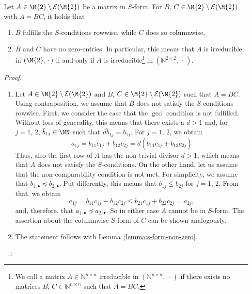 \begin{theorem}\label{theorem:s-form-factors-non-zero}
Let $A \in \M{2}\setminus\mathcal{E}(\M{2})$ be a matrix in $S$-form. For $B$, $C \in \M{2}\setminus\mathcal{E}(\M{2})$ with $A=BC$, it holds that
\begin{enumerate}[label=(\alph*)]
\item $B$ fulfills the $S$-conditions rowwise, while $C$ does so columnwise.
\item $B$ and $C$ have no zero-entries. In particular, this means that $A$ is irreducible in $(\M{2},\, \cdot\,)$ if and only if $A$ is irreducible\footnote{We call a matrix $A \in \mathbb{N}^{n \times n}$ irreducible in $(\mathbb{N}^{n \times n},\,\cdot\,)$ if there exists no matrices $B$, $C \in \mathbb{N}^{n \times n}$ such that $A=BC$.} in $(\mathbb{N}^{2 \times 2},\,\cdot\,)$.
\end{enumerate}
\end{theorem}

\begin{proof}
\begin{enumerate}[label=(\alph*)]
\item Let $A \in \M{2}\setminus\mathcal{E}(\M{2})$ and $B$, $C \in \M{2}\setminus\mathcal{E}(\M{2})$ such that $A = BC$. Using contraposition, we assume that $B$ does not satisfy the $S$-conditions rowwise. First, we consider the case that the $\gcd$ condition is not fulfilled. Without loss of generality, this means that there exists a $d >1$ and, for $j=1, \, 2$, $\tilde{b}_{1j} \in \NN$ such that $d \tilde{b}_{1j} = b_{1j}$. For $j=1, \,2$, we obtain 
\[ a_{1j} = b_{11}c_{1j} + b_{12}c_{2j} = d(\tilde{b}_{11}c_{1j} + \tilde{b}_{12}c_{2j}) \]
Thus, also the first row of $A$ has the non-trivial divisor $d>1$, which means that $A$ does not satisfy the $S$-conditions. On the other hand, let us assume that the non-comparability condition is not met. For simplicity, we assume that $b_{1, \bullet} \preceq b_{2, \bullet}$. Put differently, this means that $b_{1j} \leq b_{2j}$ for $j=1,\,2$. From that, we obtain
\[ a_{1j} = b_{11}c_{1j} + b_{12}c_{2j} \leq b_{21}c_{1j} + b_{22}c_{2j} = a_{2j}, \]
and, therefore, that $a_{1,\bullet} \preceq a_{2,\bullet}$. So in either case $A$ cannot be in $S$-form. The assertion about the columnwise $S$-form of $C$ can be shown analogously.
\item The statement follows with Lemma~\ref{lemma:s-form-non-zero}.
\end{enumerate}
\end{proof}

